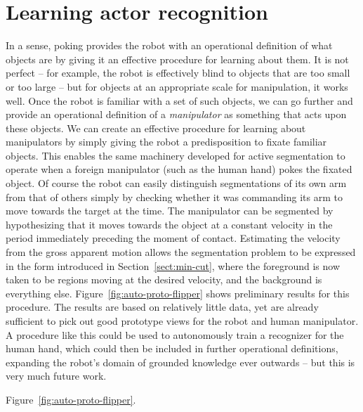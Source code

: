 
\section{Learning actor recognition}


In a sense, poking provides the robot with an operational definition
of what objects are
by giving it an
effective procedure for learning about them.  It is not perfect -- for
example, the robot is effectively blind to objects that are too small
or too large -- but for objects at an appropriate scale for
manipulation, it works well.
Once the robot is familiar with a set of such objects,
we can go further and provide an operational definition of a {\em
manipulator} as something that acts upon these objects.  We can create
an effective procedure for learning about manipulators by simply
giving the robot a predisposition to fixate familiar objects.  This
enables the same machinery developed for active segmentation to
operate when a foreign manipulator (such as the human hand) pokes the
fixated object.  Of course the robot can easily distinguish
segmentations of its own arm from that of others simply by checking
whether it was commanding its arm to move towards the target at the
time.  The manipulator can be segmented by hypothesizing that it moves
towards the object at a constant velocity in the period immediately
preceding the moment of contact.  Estimating the velocity from the
gross apparent motion allows the segmentation problem to be expressed
in the form introduced in Section~\ref{sect:min-cut}, where the
foreground is now taken to be regions moving at the desired velocity,
and the background is everything else.
Figure~\ref{fig:auto-proto-flipper}
shows preliminary results for this procedure.  The results are based on
relatively little data, yet are already
sufficient to pick out good prototype views for the robot and human
manipulator.
A procedure like this could be used to autonomously
train a recognizer for the human hand, which could then
be included in further operational definitions, expanding
the robot's domain of grounded knowledge ever outwards -- but
this is very much future work.

Figure~\ref{fig:auto-proto-flipper}.

